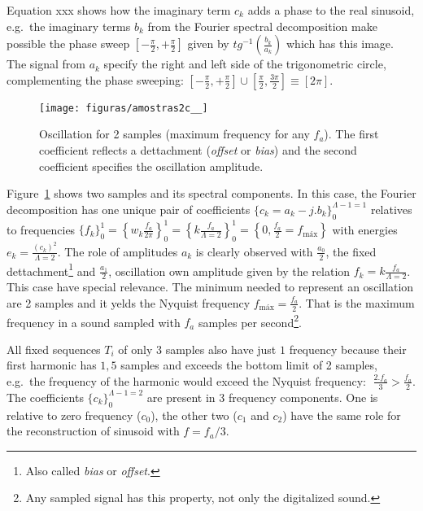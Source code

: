 \documentclass[
 aip,
 jmp,
 amsmath,amssymb,
 reprint,
]{revtex4-1}
\begin{document}
Equation xxx shows how the imaginary term $c_k$ adds a phase to the real sinusoid, e.g.\ the imaginary terms $b_k$ from the Fourier spectral decomposition make possible the phase sweep $\left[-\frac{\pi}{2},+\frac{\pi}{2}\right]$ given by $tg^{-1}\left(\frac{b_k}{a_k}\right)$ which has this image. The signal from $a_k$ specify the right and left side of the trigonometric circle, complementing the phase sweeping: $\left[-\frac{\pi}{2},+\frac{\pi}{2}\right] \cup \left[\frac{\pi}{2},\frac{3\pi}{2}\right]\equiv [2\pi]$.


 \begin{figure}[h!]
     \centering
         \texttt{[image: figuras/amostras2c\_\_]}
     \caption{Oscillation for 2 samples (maximum frequency for any $f_a$). The first coefficient reflects a dettachment (\emph{offset} or \emph{bias}) and the second coefficient specifies the oscillation amplitude.}
         \label{fig:amostras2}
 \end{figure}

Figure~\ref{fig:amostras2} shows two samples and its spectral components. In this case, the Fourier decomposition has one unique pair of coefficients $\{c_k=a_k-j.b_k\}_0^{\Lambda-1=1}$ relatives to frequencies $\{f_k\}_0^1=\left\{w_k\frac{f_a}{2\pi}\right\}_0^1=\left\{k\frac{f_a}{\Lambda=2}\right\}_0^1=\left\{0,\frac{f_a}{2}=f_{\text{máx}}\right\}$
with energies $e_k=\frac{(c_k)^2}{\Lambda=2}$. The role of amplitudes $a_k$ is clearly observed with $\frac{a_0}{2}$, the fixed dettachment\footnote{Also called \emph{bias} or \emph{offset}.} and $\frac{a_1}{2}$, oscillation own amplitude given by the relation $f_k=k \frac{f_a}{\Lambda=2}$.
This case have special relevance. The minimum needed to represent an oscillation are 2 samples and it yelds the Nyquist frequency $f_{\text{máx}}=\frac{f_a}{2}$. That is the maximum frequency in a sound sampled with $f_a$ samples per second\footnote{Any sampled signal has this property, not only the digitalized sound.}.

All fixed sequences $T_i$ of only $3$ samples also have just $1$ frequency because their first harmonic has $1,5$ samples and exceeds the bottom limit of 2 samples, e.g.\ the frequency of the harmonic would exceed the Nyquist frequency:  $\; \frac{2. f_a}{3} > \frac{f_a}{2} $. 
The coefficients $\{c_k\}_0^{\Lambda-1=2}$ are present in 3 frequency components. One is relative to zero frequency ($c_0$), the other two ($c_1$ and $c_2$) have the same role for the reconstruction of sinusoid with $f=f_a/3$.
\end{document}
